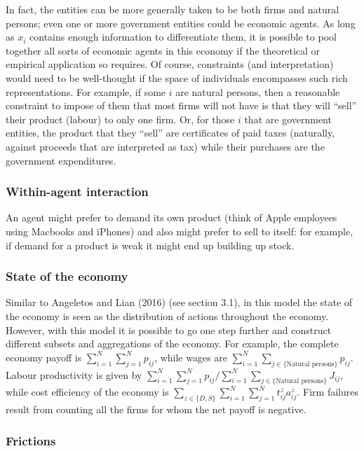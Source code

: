 \documentclass[
]{article}
\theoremstyle{plain}
\theoremstyle{definition}
\theoremstyle{remark}
\begin{document}
In fact, the entities can be more generally taken to be both firms and
natural persons; even one or more government entities could be economic
agents. As long as \(x_i\) contains enough information to differentiate
them, it is possible to pool together all sorts of economic agents in
this economy if the theoretical or empirical application so requires. Of
course, constraints (and interpretation) would need to be well-thought
if the space of individuals encompasses such rich representations. For
example, if some \(i\) are natural persons, then a reasonable constraint
to impose of them that most firms will not have is that they will
``sell'' their product (labour) to only one firm. Or, for those \(i\)
that are government entities, the product that they ``sell'' are
certificates of paid taxes (naturally, against proceeds that are
interpreted as tax) while their purchases are the government
expenditures.

\subsubsection{Within-agent interaction}\label{within-agent-interaction}

An agent might prefer to demand its own product (think of Apple
employees using Macbooks and iPhones) and also might prefer to sell to
itself: for example, if demand for a product is weak it might end up
building up stock.

\subsubsection{State of the economy}\label{state-of-the-economy}

Similar to Angeletos and Lian (2016) (see section 3.1), in this model
the state of the economy is seen as the distribution of actions
throughout the economy. However, with this model it is possible to go
one step further and construct different subsets and aggregations of the
economy. For example, the complete economy payoff is
\(\sum_{i=1}^N \sum_{j=1}^N p_{ij}\), while wages are
\(\sum_{i=1}^N \sum_{j \in \{\text{Natural persons}\}} p_{ij}\). Labour
productivity is given by
\(\sum_{i=1}^N \sum_{j=1}^N p_{ij} / \sum_{i=1}^N \sum_{j \in \{\text{Natural persons}\}} J_{ij}\),
while cost efficiency of the economy is
\(\sum_{z \in \{D, S\}}\sum_{i=1}^N \sum_{j=1}^N t_{ij}^z a_{ij}^z\).
Firm failures result from counting all the firms for whom the net payoff
is negative.

\subsubsection{Frictions}\label{frictions}
\end{document}
